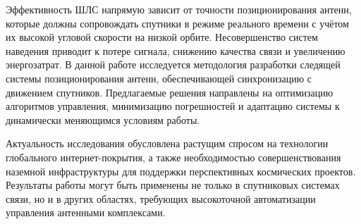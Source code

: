 Эффективность ШЛС напрямую зависит от точности позиционирования антенн, которые должны сопровождать спутники в режиме реального времени 
с учётом их высокой угловой скорости на низкой орбите. Несовершенство систем наведения приводит к потере сигнала, 
снижению качества связи и увеличению энергозатрат. В данной работе исследуется методология разработки следящей системы 
позиционирования антенн, обеспечивающей синхронизацию с движением спутников. Предлагаемые решения направлены на оптимизацию алгоритмов управления, 
минимизацию погрешностей и адаптацию системы к динамически меняющимся условиям работы.

Актуальность исследования обусловлена растущим спросом на технологии глобального интернет-покрытия, 
а также необходимостью совершенствования наземной инфраструктуры для поддержки перспективных космических проектов. 
Результаты работы могут быть применены не только в спутниковых системах связи, но и в других областях, требующих высокоточной автоматизации 
управления антенными комплексами.


